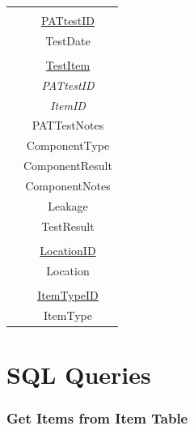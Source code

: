 \begin{center}
\begin{tabular}{|c|c|}
                                   &				                \\
                                   & \underline{PATtestID}         \\
                                   & TestDate                      \\   
                                   &				                \\
                                   & \underline{TestItem}          \\
                                   & \emph{PATtestID}              \\
                                   & \emph{ItemID}	                \\
                                   & PATTestNotes                  \\
                                   & ComponentType                 \\
                                   & ComponentResult               \\
                                   & ComponentNotes                \\
                                   & Leakage                       \\ 
                                   & TestResult                    \\ 
                                   &                               \\
                                   & \underline{LocationID}        \\
                                   & Location                      \\
                                   &                               \\
                                   & \underline{ItemTypeID}        \\
                                   & ItemType                      \\ \hline                                
    \end{tabular}
\end{center}

\section{SQL Queries}

\subsubsection{Get Items from Item Table}

